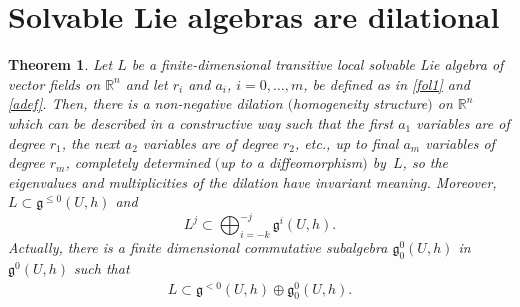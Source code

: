 \documentclass[pdftex]{sigma}
\numberwithin{equation}{section}
\newtheorem{Theorem}{Theorem}[section]
\begin{document}
\section{Solvable Lie algebras are dilational}
\begin{Theorem}\label{main}
Let $L$ be a finite-dimensional transitive local solvable Lie algebra of vector fields on ${\mathbb R}^n$ and let $r_i$ and $a_i$, $i=0,\dots,m$, be defined as in \eqref{fol1} and \eqref{adef}. Then, there is a non-negative dilation $($homogeneity structure$)$ on ${\mathbb R}^n$ which can be described in a constructive way such that the first $a_1$ variables are of degree $r_1$, the next $a_2$ variables are of degree $r_2$, etc., up to final $a_m$ variables of degree $r_m$, completely determined $($up to a diffeomorphism$)$ by~$L$, so the eigenvalues and multiplicities of the dilation have invariant meaning.
Moreover, $L\subset\mathfrak{g}^{\le 0}(U,h)$ and
$$L^j\subset \bigoplus_{i=-k}^{-j}\mathfrak{g}^i(U,h) .$$
Actually, there is a finite dimensional commutative subalgebra $\mathfrak{{g}}^{0}_0(U,h)$ in $\mathfrak{{g}}^{0}(U,h)$ such that
\begin{gather}\label{solv} L \subset \mathfrak{g}^{<0}(U,h)\oplus \mathfrak{g}_0^{0}(U,h) .
\end{gather}
\end{Theorem}
\end{document}
